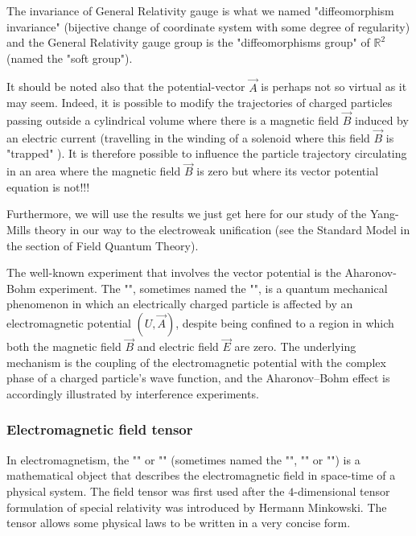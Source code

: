 	The invariance of General Relativity gauge is what we named "diffeomorphism invariance" (bijective change of coordinate system with some degree of regularity) and the General Relativity gauge group is the "diffeomorphisms group" of $\mathbb{R}^2$ (named the "soft group").

	It should be noted also that the potential-vector $\vec{A}$ is perhaps not so virtual as it may seem. Indeed, it is possible to modify the trajectories of charged particles passing outside a cylindrical volume where there is a magnetic field $\vec{B}$ induced by an electric current (travelling in the winding of a solenoid where this field $\vec{B}$ is "trapped" ). It is therefore possible to influence the particle trajectory circulating in an area where the magnetic field $\vec{B}$ is zero but where its vector potential equation is not!!!

	Furthermore, we will use the results we just get here for our study of the Yang-Mills theory in our way to the electroweak unification (see the Standard Model in the section of Field Quantum Theory). 
	\begin{tcolorbox}[title=Remark,colframe=black,arc=10pt]
	The well-known experiment that involves the vector potential is the Aharonov-Bohm experiment. The "", sometimes named the "", is a quantum mechanical phenomenon in which an electrically charged particle is affected by an electromagnetic potential $(U, \vec{A})$, despite being confined to a region in which both the magnetic field $\vec{B}$ and electric field $\vec{E}$ are zero. The underlying mechanism is the coupling of the electromagnetic potential with the complex phase of a charged particle's wave function, and the Aharonov–Bohm effect is accordingly illustrated by interference experiments.
	\end{tcolorbox}
	
	\subsubsection{Electromagnetic field tensor}
	In electromagnetism, the "\label{electromagnetic tensor}" or "" (sometimes named the "", "\label{faradey tensor}" or "") is a mathematical object that describes the electromagnetic field in space-time of a physical system. The field tensor was first used after the $4$-dimensional tensor formulation of special relativity was introduced by Hermann Minkowski. The tensor allows some physical laws to be written in a very concise form.
	
